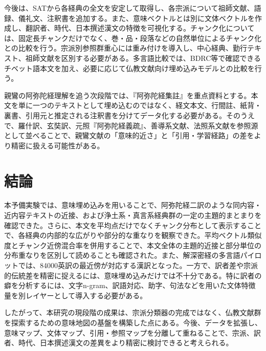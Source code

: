 \documentclass[uplatex,dvipdfmx,11pt,a4paper]{jsarticle}
\begin{document}
今後は、SATから各経典の全文を安定して取得し、各宗派について祖師文献、語録、儀礼文、注釈書を追加する。また、意味ベクトルとは別に文体ベクトルを作成し、翻訳者、時代、日本撰述漢文の特徴を可視化する。チャンク化については、固定長チャンクだけでなく、巻・品・段落などの自然単位によるチャンク化との比較を行う。宗派別参照群重心には重み付けを導入し、中心経典、勤行テキスト、祖師文献を区別する必要がある。多言語比較では、BDRC等で確認できるチベット語本文を加え、必要に応じて仏教文献向け埋め込みモデルとの比較を行う。

親鸞の阿弥陀経理解を追う次段階では、『阿弥陀経集註』を重点資料とする。本文を単に一つのテキストとして埋め込むのではなく、経文本文、行間註、紙背・裏書、引用元と推定される注釈書を分けてデータ化する必要がある。そのうえで、羅什訳、玄奘訳、元照『阿弥陀経義疏』、善導系文献、法照系文献を参照源として並べることで、親鸞文献の「意味的近さ」と「引用・学習経路」の差をより精密に扱える可能性がある。

\section{結論}

本予備実験では、意味埋め込みを用いることで、阿弥陀経二訳のような同内容・近内容テキストの近接、および浄土系・真言系経典群の一定の主題的まとまりを確認できた。さらに、本文を平均点だけでなくチャンク分布として表示することで、各経典の内部的な広がりや部分的な重なりを観察できた。平均ベクトル類似度とチャンク近傍混合率を併用することで、本文全体の主題的近接と部分単位の分布重なりを区別して読めることも確認された。また、解深密経の多言語パイロットでは、84000英訳の最近傍が対応する漢訳となった。一方で、訳者差や宗派的伝統差を精密に捉えるには、意味埋め込みだけでは不十分である。特に訳者の癖を分析するには、文字n-gram、訳語対応、助字、句法などを用いた文体特徴量を別レイヤーとして導入する必要がある。

したがって、本研究の現段階の成果は、宗派分類器の完成ではなく、仏教文献群を探索するための意味地図の基盤を構築した点にある。今後、データを拡張し、意味マップ、文体マップ、引用・参照マップを分離して重ねることで、宗派、訳者、時代、日本撰述漢文の差異をより精密に検討できると考えられる。
\end{document}
